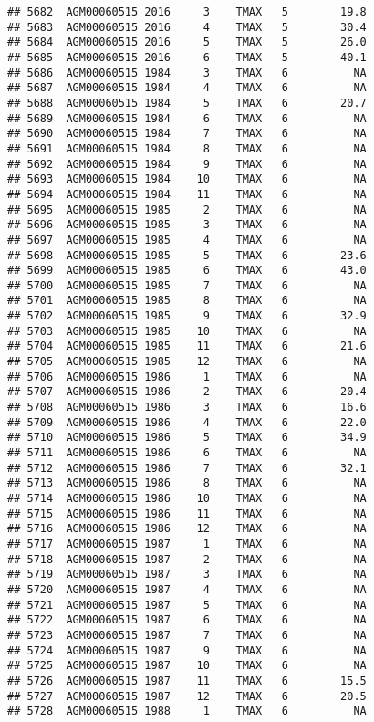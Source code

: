 \documentclass{article}\usepackage[]{graphicx}\usepackage[]{color}
\makeatletter
\newenvironment{kframe}{%
 \def\at@end@of@kframe{}%
 \ifinner\ifhmode%
  \def\at@end@of@kframe{\end{minipage}}%
  \begin{minipage}{\columnwidth}%
 \fi\fi%
 \def\FrameCommand##1{\hskip\@totalleftmargin \hskip-\fboxsep
 \colorbox{shadecolor}{##1}\hskip-\fboxsep
     \hskip-\linewidth \hskip-\@totalleftmargin \hskip\columnwidth}%
 \MakeFramed {\advance\hsize-\width
   \@totalleftmargin\z@ \linewidth\hsize
   \@setminipage}}%
 {\par\unskip\endMakeFramed%
 \at@end@of@kframe}
\newenvironment{knitrout}{}{} %
\makeatother
\begin{document}
\begin{knitrout}
\begin{kframe}
\begin{verbatim}
## 5682  AGM00060515 2016     3    TMAX   5        19.8
## 5683  AGM00060515 2016     4    TMAX   5        30.4
## 5684  AGM00060515 2016     5    TMAX   5        26.0
## 5685  AGM00060515 2016     6    TMAX   5        40.1
## 5686  AGM00060515 1984     3    TMAX   6          NA
## 5687  AGM00060515 1984     4    TMAX   6          NA
## 5688  AGM00060515 1984     5    TMAX   6        20.7
## 5689  AGM00060515 1984     6    TMAX   6          NA
## 5690  AGM00060515 1984     7    TMAX   6          NA
## 5691  AGM00060515 1984     8    TMAX   6          NA
## 5692  AGM00060515 1984     9    TMAX   6          NA
## 5693  AGM00060515 1984    10    TMAX   6          NA
## 5694  AGM00060515 1984    11    TMAX   6          NA
## 5695  AGM00060515 1985     2    TMAX   6          NA
## 5696  AGM00060515 1985     3    TMAX   6          NA
## 5697  AGM00060515 1985     4    TMAX   6          NA
## 5698  AGM00060515 1985     5    TMAX   6        23.6
## 5699  AGM00060515 1985     6    TMAX   6        43.0
## 5700  AGM00060515 1985     7    TMAX   6          NA
## 5701  AGM00060515 1985     8    TMAX   6          NA
## 5702  AGM00060515 1985     9    TMAX   6        32.9
## 5703  AGM00060515 1985    10    TMAX   6          NA
## 5704  AGM00060515 1985    11    TMAX   6        21.6
## 5705  AGM00060515 1985    12    TMAX   6          NA
## 5706  AGM00060515 1986     1    TMAX   6          NA
## 5707  AGM00060515 1986     2    TMAX   6        20.4
## 5708  AGM00060515 1986     3    TMAX   6        16.6
## 5709  AGM00060515 1986     4    TMAX   6        22.0
## 5710  AGM00060515 1986     5    TMAX   6        34.9
## 5711  AGM00060515 1986     6    TMAX   6          NA
## 5712  AGM00060515 1986     7    TMAX   6        32.1
## 5713  AGM00060515 1986     8    TMAX   6          NA
## 5714  AGM00060515 1986    10    TMAX   6          NA
## 5715  AGM00060515 1986    11    TMAX   6          NA
## 5716  AGM00060515 1986    12    TMAX   6          NA
## 5717  AGM00060515 1987     1    TMAX   6          NA
## 5718  AGM00060515 1987     2    TMAX   6          NA
## 5719  AGM00060515 1987     3    TMAX   6          NA
## 5720  AGM00060515 1987     4    TMAX   6          NA
## 5721  AGM00060515 1987     5    TMAX   6          NA
## 5722  AGM00060515 1987     6    TMAX   6          NA
## 5723  AGM00060515 1987     7    TMAX   6          NA
## 5724  AGM00060515 1987     9    TMAX   6          NA
## 5725  AGM00060515 1987    10    TMAX   6          NA
## 5726  AGM00060515 1987    11    TMAX   6        15.5
## 5727  AGM00060515 1987    12    TMAX   6        20.5
## 5728  AGM00060515 1988     1    TMAX   6          NA

\end{verbatim}
\end{kframe}
\end{knitrout}
\end{document}
